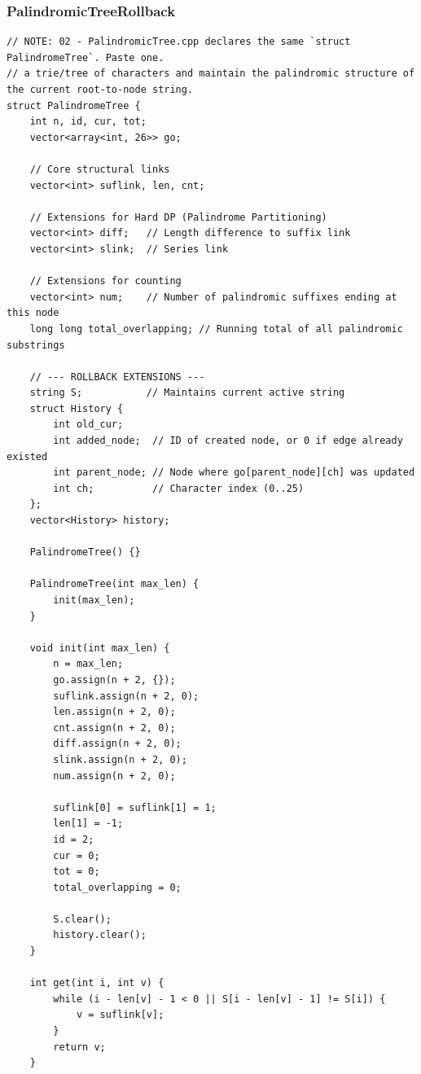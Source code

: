 \documentclass[9pt,a4paper,twocolumn]{extarticle}
\begin{document}
\subsubsection{PalindromicTreeRollback}
\nopagebreak
\begin{lstlisting}
// NOTE: 02 - PalindromicTree.cpp declares the same `struct PalindromeTree`. Paste one.
// a trie/tree of characters and maintain the palindromic structure of the current root-to-node string.
struct PalindromeTree {
    int n, id, cur, tot;
    vector<array<int, 26>> go;
    
    // Core structural links
    vector<int> suflink, len, cnt;
    
    // Extensions for Hard DP (Palindrome Partitioning)
    vector<int> diff;   // Length difference to suffix link
    vector<int> slink;  // Series link
    
    // Extensions for counting
    vector<int> num;    // Number of palindromic suffixes ending at this node
    long long total_overlapping; // Running total of all palindromic substrings

    // --- ROLLBACK EXTENSIONS ---
    string S;           // Maintains current active string
    struct History {
        int old_cur;
        int added_node;  // ID of created node, or 0 if edge already existed
        int parent_node; // Node where go[parent_node][ch] was updated
        int ch;          // Character index (0..25)
    };
    vector<History> history;

    PalindromeTree() {}

    PalindromeTree(int max_len) {
        init(max_len);
    }

    void init(int max_len) {
        n = max_len;
        go.assign(n + 2, {});
        suflink.assign(n + 2, 0);
        len.assign(n + 2, 0);
        cnt.assign(n + 2, 0);
        diff.assign(n + 2, 0);
        slink.assign(n + 2, 0);
        num.assign(n + 2, 0);

        suflink[0] = suflink[1] = 1;
        len[1] = -1;
        id = 2;
        cur = 0;
        tot = 0;
        total_overlapping = 0;
        
        S.clear();
        history.clear();
    }

    int get(int i, int v) {
        while (i - len[v] - 1 < 0 || S[i - len[v] - 1] != S[i]) {
            v = suflink[v];
        }
        return v;
    }


\end{lstlisting}
\end{document}
